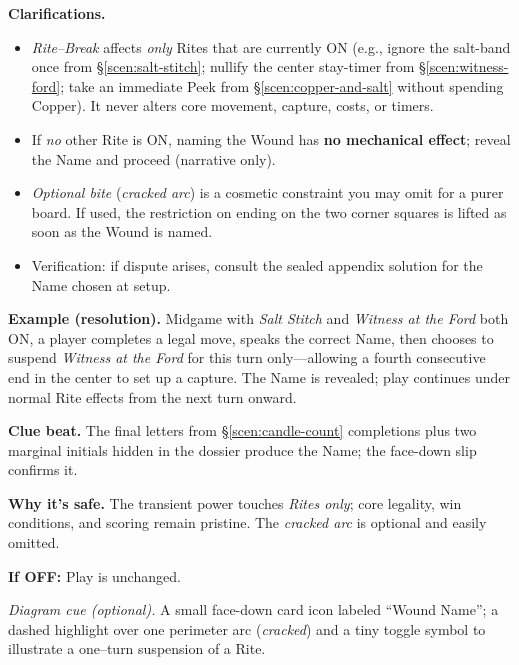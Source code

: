 \documentclass[11pt]{article}
\numberwithin{equation}{section} %
\theoremstyle{plain} %
\theoremstyle{definition} %
\theoremstyle{remark} %
\begin{document}
\medskip
\noindent\textbf{Clarifications.}
\begin{itemize}\setlength\itemsep{0.25em}
  \item \textit{Rite–Break} affects \emph{only} Rites that are currently \textsc{ON} (e.g., ignore the salt-band once from \S\ref{scen:salt-stitch}; nullify the center stay-timer from \S\ref{scen:witness-ford}; take an immediate Peek from \S\ref{scen:copper-and-salt} without spending Copper). It never alters core movement, capture, costs, or timers.
  \item If \emph{no} other Rite is \textsc{ON}, naming the Wound has \textbf{no mechanical effect}; reveal the Name and proceed (narrative only).
  \item \textit{Optional bite} (\emph{cracked arc}) is a cosmetic constraint you may omit for a purer board. If used, the restriction on ending on the two corner squares is lifted as soon as the Wound is named.
  \item Verification: if dispute arises, consult the sealed appendix solution for the Name chosen at setup.
\end{itemize}

\medskip
\noindent\textbf{Example (resolution).}  
Midgame with \emph{Salt Stitch} and \emph{Witness at the Ford} both \textsc{ON}, a player completes a legal move, speaks the correct Name, then chooses to suspend \emph{Witness at the Ford} for this turn only—allowing a fourth consecutive end in the center to set up a capture. The Name is revealed; play continues under normal Rite effects from the next turn onward.

\medskip
\noindent\textbf{Clue beat.} The final letters from \S\ref{scen:candle-count} completions plus two marginal initials hidden in the dossier produce the Name; the face-down slip confirms it.

\medskip
\noindent\textbf{Why it’s safe.} The transient power touches \emph{Rites only}; core legality, win conditions, and scoring remain pristine. The \emph{cracked arc} is optional and easily omitted.

\medskip
\noindent\textbf{If \textsc{OFF}:} Play is unchanged.

\medskip
\noindent\textit{Diagram cue (optional).} A small face-down card icon labeled “Wound Name”; a dashed highlight over one perimeter arc (\emph{cracked}) and a tiny toggle symbol to illustrate a one–turn suspension of a Rite.

\clearpage


\end{document}
